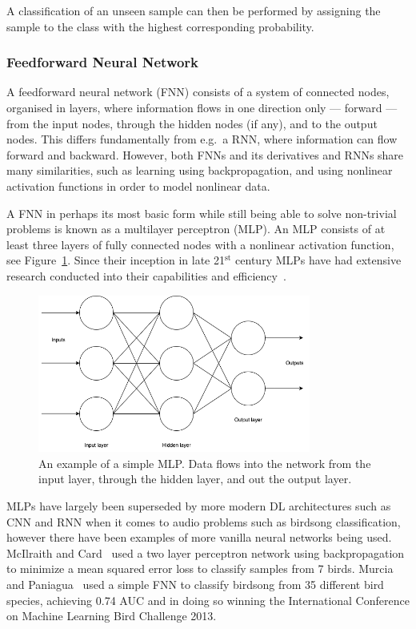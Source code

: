 A classification of an unseen sample can then be performed by assigning the
sample to the class with the highest corresponding probability.

\subsubsection{Feedforward Neural Network}

A feedforward neural network (FNN) consists of a system of connected nodes,
organised in layers, where information flows in one direction only --- forward
--- from the input nodes, through the hidden nodes (if any), and to the output
nodes. This differs fundamentally from e.g.\ a RNN, where information can flow
forward and backward. However, both FNNs and its derivatives and RNNs share
many similarities, such as learning using backpropagation, and using nonlinear
activation functions in order to model nonlinear data.

A FNN in perhaps its most basic form while still being able to solve non-trivial
problems is known as a multilayer perceptron (MLP). An MLP consists of at least
three layers of fully connected nodes with a nonlinear activation function, see
Figure~\ref{fig:mlp}. Since their inception in late 21$^{\text{st}}$ century
MLPs have had extensive research conducted into their capabilities and
efficiency~\cite{hornik1989multilayer}.

\begin{figure}[ht]
  \centering
  \includegraphics[width=0.8\textwidth]{figures/mlp.png}
  \caption{An example of a simple MLP\@. Data flows into the network from the
  input layer, through the hidden layer, and out the output layer.}\label{fig:mlp}
\end{figure}

MLPs have largely been superseded by more modern DL architectures such as CNN and
RNN when it comes to audio problems such as birdsong classification, however
there have been examples of more vanilla neural networks being used. McIlraith
and Card~\cite{mcilraith1997birdsong} used a two layer perceptron network using
backpropagation to minimize a mean squared error loss to classify samples from 7
birds. Murcia and Paniagua~\cite{murcia2013bird} used a simple FNN to classify
birdsong from 35 different bird species, achieving 0.74 AUC and in doing so
winning the International Conference on Machine Learning Bird Challenge 2013.

